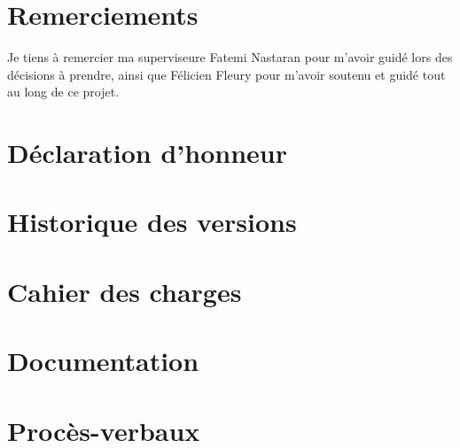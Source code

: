 \printglossary

\chapter*{Remerciements}
Je tiens à remercier ma superviseure Fatemi Nastaran pour m'avoir guidé lors des décisions à prendre, ainsi que Félicien Fleury pour m'avoir soutenu et guidé tout au long de ce projet.

\chapter*{Déclaration d'honneur}


\appendix

\chapter{Historique des versions}


\chapter{Cahier des charges}


\chapter{Documentation}


% 

\chapter{Procès-verbaux}




